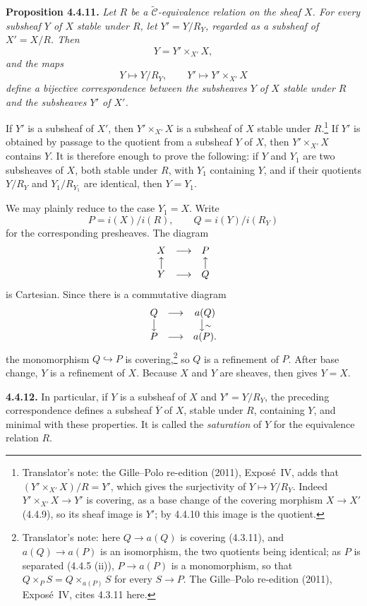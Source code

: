 

\medskip
\noindent{}\textbf{Proposition 4.4.11.}
\textit{Let \(R\) be a \(\widetilde{\mathscr C}\)-equivalence relation on the
sheaf \(X\). For every subsheaf \(Y\) of \(X\) stable under \(R\), let
\(Y'=Y/R_Y\), regarded as a subsheaf of \(X'=X/R\). Then}
\[
  Y=Y'\times_{X'}X,
\]
\textit{and the maps}
\[
  Y\longmapsto Y/R_Y,
  \qquad
  Y'\longmapsto Y'\times_{X'}X
\]
\textit{define a bijective correspondence between the subsheaves \(Y\) of
\(X\) stable under \(R\) and the subsheaves \(Y'\) of \(X'\).}

If \(Y'\) is a subsheaf of \(X'\), then \(Y'\times_{X'}X\) is a subsheaf of
\(X\) stable under \(R\).\footnote{Translator's note: the Gille--Polo re-edition (2011), Expos\'e~IV, adds
that \((Y'\times_{X'}X)/R=Y'\), which gives the surjectivity of
\(Y\mapsto Y/R_Y\). Indeed \(Y'\times_{X'}X\to Y'\) is covering, as a base
change of the covering morphism \(X\to X'\) (4.4.9), so its sheaf image is
\(Y'\); by 4.4.10 this image is the quotient.}
If \(Y'\) is obtained by passage to the quotient from a subsheaf \(Y\) of
\(X\), then \(Y'\times_{X'}X\) contains \(Y\). It is therefore
enough to prove the following: if \(Y\) and \(Y_1\) are two subsheaves of
\(X\), both stable under \(R\), with \(Y_1\) containing \(Y\), and if their
quotients \(Y/R_Y\) and \(Y_1/R_{Y_1}\) are identical, then \(Y=Y_1\).

We may plainly reduce to the case \(Y_1=X\). Write
\[
  P=i(X)/i(R),\qquad Q=i(Y)/i(R_Y)
\]
for the corresponding presheaves. The diagram
\[
\begin{array}{ccc}
  X&\longrightarrow&P\\
  \big\uparrow&&\big\uparrow\\
  Y&\longrightarrow&Q
\end{array}
\]
is Cartesian. Since there is a commutative diagram
\[
\begin{array}{ccc}
  Q&\longrightarrow&a(Q)\\
  \big\downarrow&&\big\downarrow{\scriptstyle\sim}\\
  P&\longrightarrow&a(P).
\end{array}
\]
the monomorphism \(Q\hookrightarrow P\) is covering,\footnote{Translator's note: here \(Q\to a(Q)\) is covering (4.3.11),
and \(a(Q)\to a(P)\) is an isomorphism, the two quotients being identical; as
\(P\) is separated (4.4.5 (ii)), \(P\to a(P)\) is a monomorphism, so that
\(Q\times_PS=Q\times_{a(P)}S\) for every \(S\to P\). The Gille--Polo re-edition
(2011), Expos\'e~IV, cites 4.3.11 here.} so \(Q\) is a refinement of \(P\).
After base change, \(Y\) is a refinement of \(X\). Because \(X\) and \(Y\)
are sheaves,  then gives \(Y=X\).

\medskip
\noindent{}\textbf{4.4.12.}
In particular, if \(Y\) is a subsheaf of \(X\) and \(Y'=Y/R_Y\), the
preceding correspondence defines a subsheaf \(\overline Y\) of \(X\), stable
under \(R\), containing \(Y\), and minimal with these properties.
It is called the \emph{saturation} of \(Y\) for the equivalence relation
\(R\).

